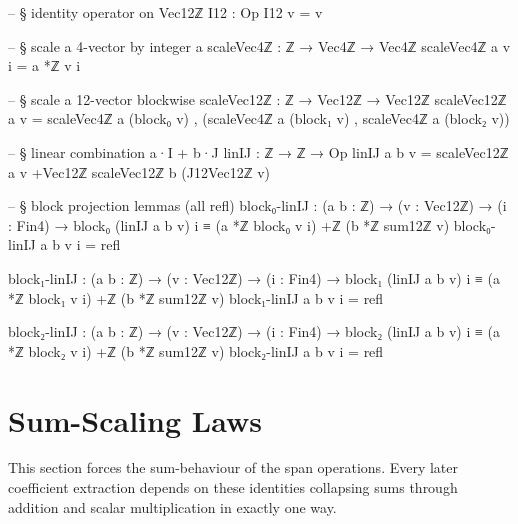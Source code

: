 \documentclass[11pt,a4paper]{book}
\begin{document}
\begin{code}
-- § identity operator on Vec12ℤ
I12 : Op
I12 v = v

-- § scale a 4-vector by integer a
scaleVec4ℤ : ℤ → Vec4ℤ → Vec4ℤ
scaleVec4ℤ a v i = a *ℤ v i

-- § scale a 12-vector blockwise
scaleVec12ℤ : ℤ → Vec12ℤ → Vec12ℤ
scaleVec12ℤ a v = scaleVec4ℤ a (block₀ v) , (scaleVec4ℤ a (block₁ v) , scaleVec4ℤ a (block₂ v))

-- § linear combination a·I + b·J
linIJ : ℤ → ℤ → Op
linIJ a b v = scaleVec12ℤ a v +Vec12ℤ scaleVec12ℤ b (J12Vec12ℤ v)

-- § block projection lemmas (all refl)
block₀-linIJ : (a b : ℤ) → (v : Vec12ℤ) → (i : Fin4) →
  block₀ (linIJ a b v) i ≡ (a *ℤ block₀ v i) +ℤ (b *ℤ sum12ℤ v)
block₀-linIJ a b v i = refl

block₁-linIJ : (a b : ℤ) → (v : Vec12ℤ) → (i : Fin4) →
  block₁ (linIJ a b v) i ≡ (a *ℤ block₁ v i) +ℤ (b *ℤ sum12ℤ v)
block₁-linIJ a b v i = refl

block₂-linIJ : (a b : ℤ) → (v : Vec12ℤ) → (i : Fin4) →
  block₂ (linIJ a b v) i ≡ (a *ℤ block₂ v i) +ℤ (b *ℤ sum12ℤ v)
block₂-linIJ a b v i = refl
\end{code}

\section{Sum-Scaling Laws}

This section forces the sum-behaviour of the span operations.
Every later coefficient extraction depends on these identities collapsing sums
through addition and scalar multiplication in exactly one way.
\end{document}
